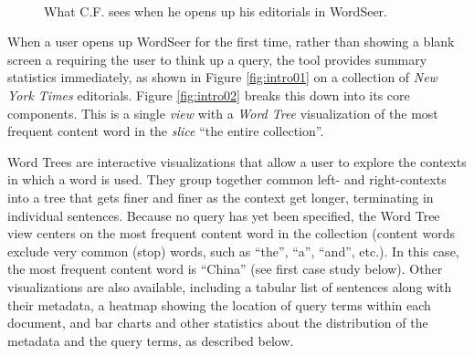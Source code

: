 \documentclass{sig-alternate}
\begin{document}
\begin{figure}[ht!]
\begin{center}
%
        \\
%
    \end{center}
    \caption{%
        What C.F. sees when he opens up his editorials in WordSeer.
     }%
\end{figure}

When a user opens up WordSeer for the first time, rather than showing a blank screen a requiring the user to think up a query, the tool  provides summary statistics immediately, as shown in Figure \ref{fig:intro01} on a collection of \emph{New York Times} editorials.  Figure \ref{fig:intro02} breaks this down into its core components. This is a single \emph{view} with a \emph{Word Tree} visualization of the most frequent content word in the \emph{slice} ``the entire collection''. 

Word Trees \cite{wattenberg_word_2008} are interactive visualizations that allow a user to explore the contexts in which a word is used. They group together common left- and right-contexts into a tree that gets finer and finer as the context get longer, terminating in individual sentences.  Because no query has yet been specified, the Word Tree view centers on the most frequent content word in the collection (content words exclude very common (stop) words, such as ``the'', ``a'', ``and'', etc.). In this case, the most frequent content word is ``China'' (see first case study below).  Other visualizations are also available, including a tabular list of sentences along with their metadata, a heatmap showing the location of query terms within each document, and bar charts and other statistics about the distribution of the metadata and the query terms, as described below.
\end{document}
